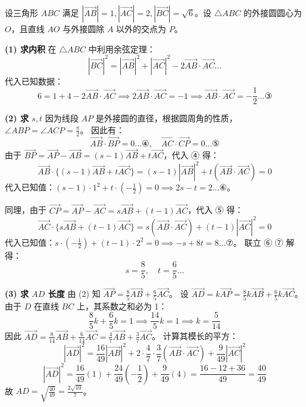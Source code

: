 \begin{questions}
\question 
设三角形 $ABC$ 满足 $|\vec{AB}| = 1, |\vec{AC}| = 2, |\vec{BC}| = \sqrt{6}$。设 $\triangle ABC$ 的外接圆圆心为 $O$，且直线 $AO$ 与外接圆除 $A$ 以外的交点为 $P$。

\begin{solution}
    \textbf{(1) 求内积}
    在 $\triangle ABC$ 中利用余弦定理：
    \[
    |\vec{BC}|^2 = |\vec{AB}|^2 + |\vec{AC}|^2 - 2\vec{AB} \cdot \vec{AC} \dots \text{}
    \]
    代入已知数据：
    \[
    6 = 1 + 4 - 2\vec{AB} \cdot \vec{AC} \implies 2\vec{AB} \cdot \vec{AC} = -1 \implies \vec{AB} \cdot \vec{AC} = -\frac{1}{2} \dots ③ \text{}
    \]

    \textbf{(2) 求 $s, t$}
    因为线段 $AP$ 是外接圆的直径，根据圆周角的性质，$\angle ABP = \angle ACP = \frac{\pi}{2}$。
    因此有：
    \[
    \vec{AB} \cdot \vec{BP} = 0 \dots ④, \quad \vec{AC} \cdot \vec{CP} = 0 \dots ⑤ \text{}
    \]
    由于 $\vec{BP} = \vec{AP} - \vec{AB} = (s-1)\vec{AB} + t\vec{AC}$，代入 ④ 得：
    \[
    \vec{AB} \cdot \{(s-1)\vec{AB} + t\vec{AC}\} = (s-1)|\vec{AB}|^2 + t(\vec{AB} \cdot \vec{AC}) = 0
    \]
    代入已知值：$(s-1) \cdot 1^2 + t \cdot (-\frac{1}{2}) = 0 \implies 2s - t = 2 \dots ⑥$。
    
    同理，由于 $\vec{CP} = \vec{AP} - \vec{AC} = s\vec{AB} + (t-1)\vec{AC}$，代入 ⑤ 得：
    \[
    \vec{AC} \cdot \{s\vec{AB} + (t-1)\vec{AC}\} = s(\vec{AB} \cdot \vec{AC}) + (t-1)|\vec{AC}|^2 = 0
    \]
    代入已知值：$s \cdot (-\frac{1}{2}) + (t-1) \cdot 2^2 = 0 \implies -s + 8t = 8 \dots ⑦$。
    联立 ⑥ ⑦ 解得：
    \[
    s = \frac{8}{5}, \quad t = \frac{6}{5} \dots \text{}
    \]

    \textbf{(3) 求 $AD$ 长度}
    由 (2) 知 $\vec{AP} = \frac{8}{5}\vec{AB} + \frac{6}{5}\vec{AC}$。
    设 $\vec{AD} = k\vec{AP} = \frac{8}{5}k\vec{AB} + \frac{6}{5}k\vec{AC}$。
    由于 $D$ 在直线 $BC$ 上，其系数之和必为 1：
    \[
    \frac{8}{5}k + \frac{6}{5}k = 1 \implies \frac{14}{5}k = 1 \implies k = \frac{5}{14} \text{}
    \]
    因此 $\vec{AD} = \frac{8}{14}\vec{AB} + \frac{6}{14}\vec{AC} = \frac{4}{7}\vec{AB} + \frac{3}{7}\vec{AC}$。
    计算其模长的平方：
    \[
    |\vec{AD}|^2 = \frac{16}{49}|\vec{AB}|^2 + 2 \cdot \frac{4}{7} \cdot \frac{3}{7}(\vec{AB} \cdot \vec{AC}) + \frac{9}{49}|\vec{AC}|^2
    \]
    \[
    |\vec{AD}|^2 = \frac{16}{49}(1) + \frac{24}{49}(-\frac{1}{2}) + \frac{9}{49}(4) = \frac{16 - 12 + 36}{49} = \frac{40}{49} \text{}
    \]
    故 $AD = \sqrt{\frac{40}{49}} = \frac{2\sqrt{10}}{7}$。
\end{solution}


\end{questions}
